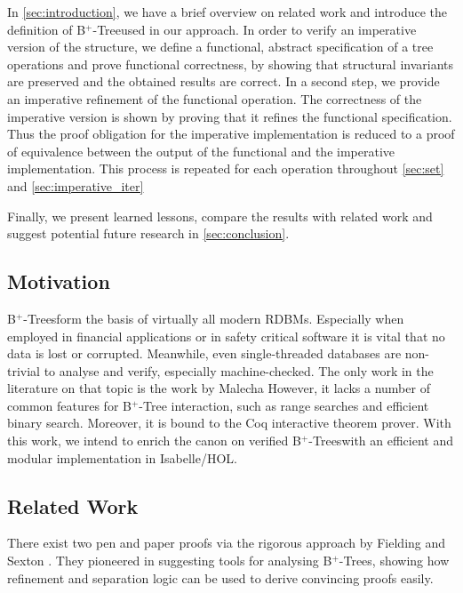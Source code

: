 \documentclass[a4paper,UKenglish,cleveref, autoref, thm-restate]{lipics-v2021}
\newcommand{\btree}{B$^+$-Tree}
\newcommand{\btrees}{B$^+$-Trees}
\begin{document}
In \autoref{sec:introduction}, we have a brief overview on related
work and introduce the definition of \btree used in our approach.
In order to verify an imperative version of the structure,
we define a functional, abstract specification of a tree operations
and prove functional correctness, by showing that structural invariants are preserved
and the obtained results are correct.
In a second step, we provide an imperative refinement
of the functional operation.
The correctness of the imperative version is shown by proving that it refines the functional specification.
Thus the proof obligation for the imperative implementation
is reduced to a proof of equivalence between the output of the
functional and the imperative implementation.
This process is repeated for each operation throughout
\autoref{sec:set} and \autoref{sec:imperative_iter}

Finally, we present learned lessons, compare the results with related work and suggest potential future
research in \autoref{sec:conclusion}.


\subsection{Motivation}
\label{sec:motivation}

\btrees form the basis of virtually all modern RDBMs.
Especially when employed in financial applications
or in safety critical software it is vital that
no data is lost or corrupted.
Meanwhile, even single-threaded databases
are non-trivial to analyse and verify,
especially machine-checked.
The only work in the literature on that topic
is the work by Malecha %
However, it lacks a number of common features for \btree
interaction, such as range searches and efficient binary search.
Moreover, it is bound to the Coq interactive theorem prover.
With this work, we intend to enrich the canon on verified
\btrees with an efficient and modular implementation
in Isabelle/HOL.


\subsection{Related Work}
\label{sec:related_work}

There exist two pen and paper proofs via the rigorous approach
by Fielding \cite{Fielding80} and Sexton \cite{DBLP:journals/entcs/SextonT08}.
They pioneered in suggesting tools for analysing \btrees,
showing how refinement and separation logic can be used to
derive convincing proofs easily.
\end{document}
